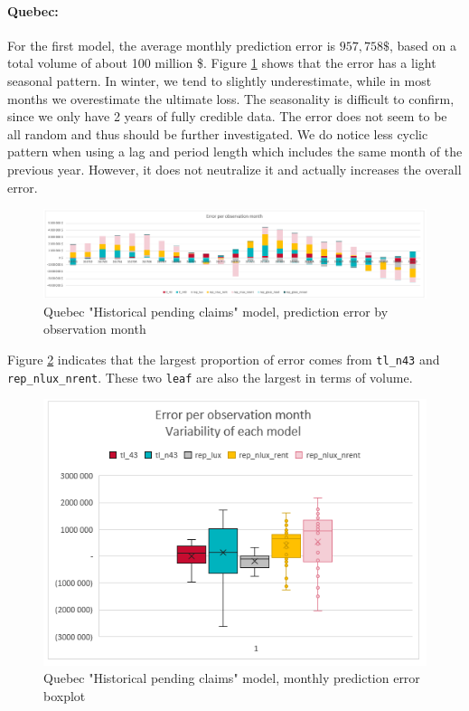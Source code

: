 	\paragraph{Quebec:}
		For the first model, the average monthly prediction error is $957,758 \$$, based on a total volume of about 100 million \$. Figure \ref{Fig_QC_current_er_by_month} shows that the error has a light seasonal pattern. In winter, we tend to slightly underestimate, while in most months we overestimate the ultimate loss. The seasonality is difficult to confirm, since we only have 2 years of fully credible data. The error does not seem to be all random and thus should be further investigated. We do notice less cyclic pattern when using a lag and period length which includes the same month of the previous year. However, it does not neutralize it and actually increases the overall error.
		\begin{figure}[H]
			\begin{center}
				\includegraphics[scale=0.4]{Graphiques/QC_current_model_by_month} 
				\renewcommand{\figurename}{Figure}
				\caption[Quebec version one model error]{Quebec "Historical pending claims" model, prediction error by observation month}\label{Fig_QC_current_er_by_month}
			\end{center}
		\end{figure}
		Figure \ref{Fig_QC_current_er_boxplot} indicates that the largest proportion of error comes from \texttt{tl\_n43} and \texttt{rep\_nlux\_nrent}. These two \texttt{leaf} are also the largest in terms of volume. 
		\begin{figure}[H]
			\begin{center}
				\includegraphics[scale=0.4]{Graphiques/QC_current_model_mustach} 
				\renewcommand{\figurename}{Figure}
				\caption[Quebec version one model error - boxplot]{Quebec "Historical pending claims" model, monthly prediction error boxplot}\label{Fig_QC_current_er_boxplot}
			\end{center}
		\end{figure}
	
